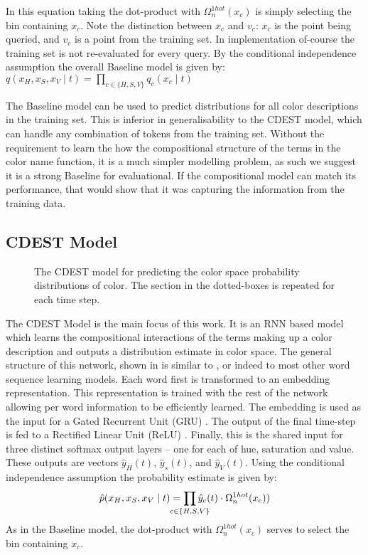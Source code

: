 \documentclass[11pt,letterpaper, twocolumn]{article}
\newcommand{\compactmath}[1]{\noindent\resizebox{\columnwidth}{!}{$#1$}}
\newcommand{\parencite}{\citep}
\newcommand{\textcite}{\cite}
\begin{document}
\compactmath{
	q_{c}(x_{c}\mid t)=\frac{\displaystyle
		\sum_{\mathrlap{\!\!\forall((v_{H},v_{S},v_{V}),t)\in V_{|t}}}
			\Omega_n^{blur}(v_{c},\mathcal{D}_c,\sigma)
			\cdot
			\Omega_n^{1hot}(x_{c})		
			+1}
		{\left|V_{|t}\right|+n}
}
%
In this equation taking the dot-product with $\Omega_n^{1hot}(x_{c})$ is simply selecting the bin containing $x_c$.
Note the distinction between $x_c$ and $v_c$: $x_c$ is the point being queried, and $v_c$ is a point from the training set.
In implementation of-course the training set is not re-evaluated for every query.
By the conditional independence assumption the overall Baseline model is given by: $q(x_H,x_S,x_V\mid t) = \prod_{c\in {\{H,S,V\}}} q_c(x_c\mid t)$


The Baseline model can be used to predict distributions for all color descriptions in the training set.
This is inferior in generalisability to the CDEST model, which can handle any combination of tokens from the training set.
Without the requirement to learn the how the compositional structure of the terms in the color name function, it is a much simpler modelling problem, as such we suggest it is a strong Baseline for evaluational.
If the compositional model can match its performance, that would show that it was capturing the information from the training data.

\subsection{CDEST Model}

\begin{figure}
	\resizebox{\columnwidth}{!}{}
	
	\caption{\label{network}
		The CDEST model for predicting the color space probability distributions of color.
		The section in the dotted-boxes is repeated for each time step.
	}
\end{figure}

The CDEST Model is the main focus of this work.
It is an RNN based model which learns the compositional interactions of the terms making up a color description and outputs a distribution estimate in color space.
The general structure of this network, shown in  is similar to \textcite{2016arXiv160603821M}, or indeed to most other word sequence learning models.
Each word first is transformed to an embedding representation.
This representation is trained with the rest of the network allowing per word information to be efficiently learned.
The embedding is used as the input for a Gated Recurrent Unit (GRU)  \parencite{cho2014properties}.
The output of the final time-step is fed to a Rectified Linear Unit (ReLU)  \parencite{dahl2013reludropout}.
Finally, this is the shared input for three distinct softmax output layers -- one for each of hue, saturation and value.
These outputs are vectors $\hat{y}_{H}(t)$, $\hat{y}_{s}(t)$, and $\hat{y}_{V}(t)$.
Using the conditional independence assumption the probability estimate is given by:
\[
	\hat{p}(x_H,x_S,x_V\mid t) = \displaystyle\prod_{
		\mathclap{c\in {\{H,S,V\}}}}
	 \hat{y}_{c}(t)\cdot \Omega_{n}^{1hot}(x_c))
\]
As in the Baseline model, the dot-product with $\Omega_{n}^{1hot}(x_c)$ serves to select the bin containing $x_c$.
\end{document}
